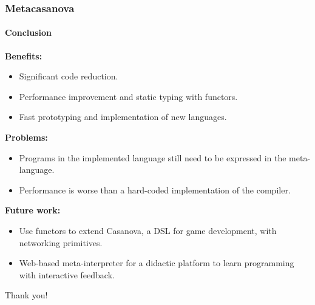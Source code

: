 \documentclass[10pt,a4paper]{beamer}
\begin{document}
\begin{frame}
\frametitle{Metacasanova}
\framesubtitle{Conclusion}

\textbf{Benefits:}
\begin{itemize}
	\item Significant code reduction.
	\item Performance improvement and static typing with functors.
	\item Fast prototyping and implementation of new languages.
\end{itemize}

\textbf{Problems:}
\begin{itemize}
	\item Programs in the implemented language still need to be expressed in the meta-language.
	\item Performance is worse than a hard-coded implementation of the compiler.
\end{itemize}

\textbf{Future work:}
\begin{itemize}
	\item Use functors to extend Casanova, a DSL for game development, with networking primitives.
	\item Web-based meta-interpreter for a didactic platform to learn programming with interactive feedback. 
\end{itemize}
\end{frame}

\begin{frame}
\centering
\Huge
Thank you!
\end{frame}
\end{document}
